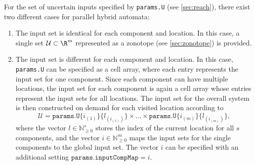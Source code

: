 For the set of uncertain inputs specified by \texttt{params.U} (see \cref{sec:reach}), there exist two different cases for parallel hybrid automata:
\begin{enumerate}
	\item The input set is identical for each component and location. In this case, a single set $\mathcal{U} \subset \R^m$ represented as a zonotope (see \cref{sec:zonotope}) is provided.
	\item The input set is different for each component and location. In this case, \texttt{params.U} can be specified as a cell array, where each entry represents the input set for one component. Since each component can have multiple locations, the input set for each component is again a cell array whose entries represent the input sets for all locations. The input set for the overall system is then constructed on demand for each visited location according to
	\begin{equation*}
		\mathcal{U} = \texttt{params.U\{}i_{(1)}\texttt{\}\{}l_{(i_{(1)})} \texttt{\}} \times \dots \times \texttt{params.U\{}i_{(m)}\texttt{\}\{}l_{(i_{(m)})} \texttt{\}} ,
	\end{equation*}
	where the vector $l \in \mathbb{N}_{\geq 0}^s$ stores the index of the current location for all $s$ components, and the vector $i \in \mathbb{N}_{\geq 0}^m$ maps the input sets for the single components to the global input set. The vector $i$ can be specified with an additional setting $\texttt{params.inputCompMap} = i$. 
\end{enumerate}
